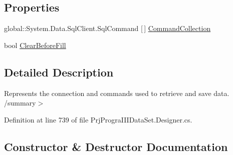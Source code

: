 \subsection*{Properties}
\begin{DoxyCompactItemize}
\item 
global\+::\+System.\+Data.\+Sql\+Client.\+Sql\+Command \mbox{[}$\,$\mbox{]} \hyperlink{classprj_progra_i_i_i_1_1_prj_progra_i_i_i_data_set_table_adapters_1_1rpt___get_sales_by_day_table_adapter_ac4bcf7387f0c5a745fe16d6b4993d44f}{Command\+Collection}
\item 
bool \hyperlink{classprj_progra_i_i_i_1_1_prj_progra_i_i_i_data_set_table_adapters_1_1rpt___get_sales_by_day_table_adapter_a205d6495861bb5c2b5508b803b8fea24}{Clear\+Before\+Fill}
\end{DoxyCompactItemize}


\subsection{Detailed Description}
Represents the connection and commands used to retrieve and save data. /summary$>$ 

Definition at line 739 of file Prj\+Progra\+I\+I\+I\+Data\+Set.\+Designer.\+cs.



\subsection{Constructor \& Destructor Documentation}
\hypertarget{classprj_progra_i_i_i_1_1_prj_progra_i_i_i_data_set_table_adapters_1_1rpt___get_sales_by_day_table_adapter_a1065834c6bfbfddf79a1ed3a5d24ff8c}{}\label{classprj_progra_i_i_i_1_1_prj_progra_i_i_i_data_set_table_adapters_1_1rpt___get_sales_by_day_table_adapter_a1065834c6bfbfddf79a1ed3a5d24ff8c} 
